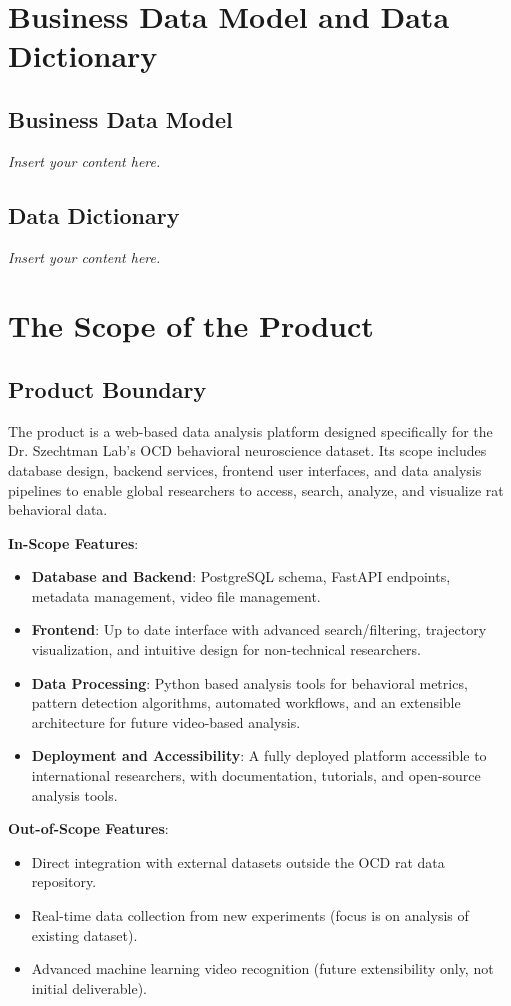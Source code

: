 \documentclass[12pt]{article}
\newcommand{\lips}{\textit{Insert your content here.}}
\begin{document}
\section{Business Data Model and Data Dictionary}
\subsection{Business Data Model}
\lips
\subsection{Data Dictionary}
\lips

\section{The Scope of the Product}

\subsection{Product Boundary}
The product is a web-based data analysis platform designed specifically for the Dr. Szechtman Lab’s OCD behavioral neuroscience dataset. Its scope includes database design, backend services, frontend user interfaces, and data analysis pipelines to enable global researchers to access, search, analyze, and visualize rat behavioral data.

\textbf{In-Scope Features}:
\begin{itemize}
    \item \textbf{Database and Backend}: PostgreSQL schema, FastAPI endpoints, metadata management, video file management.
    \item \textbf{Frontend}: Up to date interface with advanced search/filtering, trajectory visualization, and intuitive design for non-technical researchers.
    \item \textbf{Data Processing}: Python based analysis tools for behavioral metrics, pattern detection algorithms, automated workflows, and an extensible architecture for future video-based analysis.
    \item \textbf{Deployment and Accessibility}: A fully deployed platform accessible to international researchers, with documentation, tutorials, and open-source analysis tools.
\end{itemize}

\textbf{Out-of-Scope Features}:
\begin{itemize}
    \item Direct integration with external datasets outside the OCD rat data repository.
    \item Real-time data collection from new experiments (focus is on analysis of existing dataset).
    \item Advanced machine learning video recognition (future extensibility only, not initial deliverable).
\end{itemize}
\end{document}
